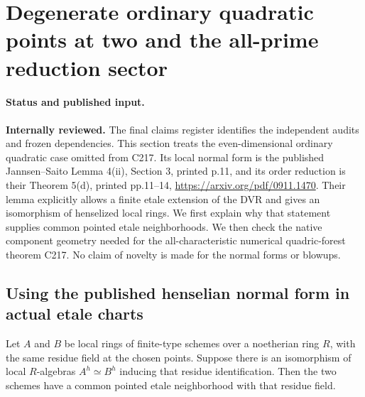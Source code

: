 \section{Degenerate ordinary quadratic points at two and the all-prime reduction sector}
\label{r17cd2:section}

\paragraph{Status and published input.}
\textbf{Internally reviewed.} The final claims register identifies the independent audits and frozen dependencies.
This section treats the even-dimensional ordinary quadratic
case omitted from C217. Its local normal form is the published
Jannsen--Saito Lemma 4(ii), Section 3, printed p.11, and its
order reduction is their Theorem 5(d), printed pp.11--14,
\url{https://arxiv.org/pdf/0911.1470}. Their lemma explicitly
allows a finite etale extension of the DVR and gives an
isomorphism of henselized local rings. We first explain why
that statement supplies common pointed etale neighborhoods.
We then check the native component geometry needed for the
all-characteristic numerical quadric-forest theorem C217.
No claim of novelty is made for the normal forms or blowups.

\subsection{Using the published henselian normal form in actual etale charts}

\begin{lemma}
\label{r17cd2:henselian-chart}
Let $A$ and $B$ be local rings of finite-type schemes over
a noetherian ring $R$, with the same residue field at the
chosen points. Suppose there is an isomorphism of local
$R$-algebras $A^h\simeq B^h$ inducing that residue
identification. Then the two schemes have a common pointed
etale neighborhood with that residue field.
\end{lemma}

